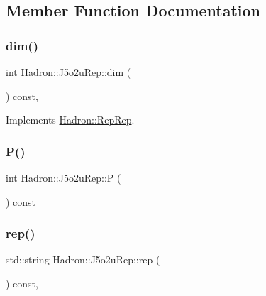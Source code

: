 \subsection{Member Function Documentation}
\mbox{\label{structHadron_1_1J5o2uRep_a7168156bdf8a4353ed627e4be0a16f8b}} 
\subsubsection{\texorpdfstring{dim()}{dim()}}
{\footnotesize\ttfamily int Hadron\+::\+J5o2u\+Rep\+::dim (\begin{DoxyParamCaption}{ }\end{DoxyParamCaption}) const\hspace{0.3cm}{\ttfamily [inline]}, {\ttfamily [virtual]}}



Implements \mbox{\hyperlink{structHadron_1_1RepRep_a92c8802e5ed7afd7da43ccfd5b7cd92b}{Hadron\+::\+Rep\+Rep}}.

\mbox{\label{structHadron_1_1J5o2uRep_a61de16e8a0a311ebef917a04c3930c4f}} 
\subsubsection{\texorpdfstring{P()}{P()}}
{\footnotesize\ttfamily int Hadron\+::\+J5o2u\+Rep\+::P (\begin{DoxyParamCaption}{ }\end{DoxyParamCaption}) const\hspace{0.3cm}{\ttfamily [inline]}}

\mbox{\label{structHadron_1_1J5o2uRep_a553987fff53057668bc9213e32116341}} 
\subsubsection{\texorpdfstring{rep()}{rep()}}
{\footnotesize\ttfamily std\+::string Hadron\+::\+J5o2u\+Rep\+::rep (\begin{DoxyParamCaption}{ }\end{DoxyParamCaption}) const\hspace{0.3cm}{\ttfamily [inline]}, {\ttfamily [virtual]}}



